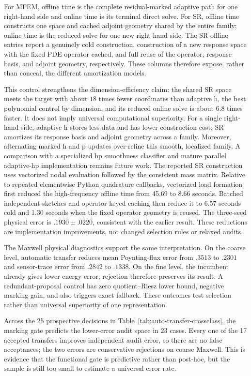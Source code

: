 \documentclass[11pt]{article}
\numberwithin{algorithm}{section}
\theoremstyle{definition}\newtheorem{definition}[theorem]{Definition}
\theoremstyle{remark}\newtheorem{remark}[theorem]{Remark}
\begin{document}
For MFEM, offline time is the complete residual-marked adaptive path for one
right-hand side and online time is its terminal direct solve.  For SR, offline
time constructs one space and cached adjoint geometry shared by the entire
family; online time is the reduced solve for one new right-hand side.  The SR
offline entries report a genuinely cold construction, construction of a new
response space with the fixed PDE operator cached, and full reuse of the
operator, response basis, and adjoint geometry, respectively.  These
columns therefore expose, rather than conceal, the different amortization
models.

This control strengthens the dimension-efficiency claim: the shared SR space
meets the target with about $18$ times fewer coordinates than adaptive h, the
best polynomial control by dimension, and its reduced online solve is about
$6.8$ times faster.  It does not imply universal computational superiority.
For a single right-hand side, adaptive h stores less data and has lower
construction cost; SR amortizes its response basis and adjoint geometry across
a family.  Moreover, alternating marked h and p updates over-refine this smooth,
localized family.  A comparison with a specialized hp smoothness classifier
and mature parallel adaptive-hp implementation remains future work.
The reported SR construction uses vectorized nodal evaluation followed by the
consistent mass matrix.  Relative to repeated elementwise Python quadrature
callbacks, vectorized load formation first reduced the high-frequency offline
time from 45.69 to 8.66 seconds.  Batched independent sketches and
operator-keyed caching then reduce it to 6.57 seconds cold and 1.30 seconds
when the fixed operator geometry is reused.  The three-seed physical error is
$.1930\pm.0220$, consistent with the earlier result.  These reductions are
implementation improvements, not changed selection rules or relaxed audits.

The Maxwell physical diagnostics support the same interpretation.  On the
coarse level, automatic transfer reduces mean Poynting-flux error from $.3513$
to $.2301$ and sensor-trace error from $.2842$ to $.1338$.  On the fine level,
the incumbent already gives lower energy error; rejection therefore preserves
its result.  A redundant-proposal control has zero quotient--Riesz lower bound,
negative marking gain, and also triggers exact fallback.  These outcomes test
selection rather than universal superiority of one representation.

Across the 25 prospective decisions in Table~\ref{tab:auto-transfer-crossclass},
the marking gate predicts the lower-error audit space in 23 cases.  Every one
of the 17 accepted transfers improves independent audit error, so there are no
false acceptances; the two errors are conservative rejections on coarse
Maxwell.  This is evidence that the functional gate is predictive rather than
post-hoc, but the sample is still too small to estimate a universal error rate.
\end{document}
